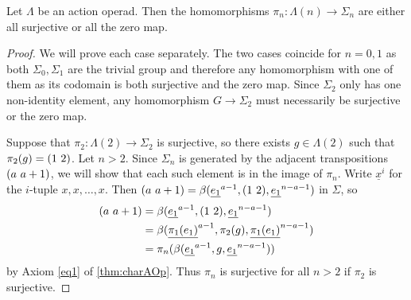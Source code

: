 \begin{prop}\label{prop:surjortriv} Let $\Lambda$ be an action operad. Then the homomorphisms $\pi_n \colon \Lambda(n) \rightarrow \Sigma_n$ are either all surjective or all the zero map.
\end{prop}
\begin{proof}
We will prove each case separately. The two cases coincide for $n = 0, 1$ as both $\Sigma_0, \Sigma_1$ are the trivial group and therefore any homomorphism with one of them as its codomain is both surjective and the zero map. Since $\Sigma_2$ only has one non-identity element, any homomorphism $G \rightarrow \Sigma_2$ must necessarily be surjective or the zero map.

Suppose that $\pi_2 \colon \Lambda(2) \rightarrow \Sigma_2$ is surjective, so there exists $g \in \Lambda(2)$ such that $\pi_2(g) = ( 1 \, \, 2 )$. Let $n>2$. Since $\Sigma_n$ is generated by the adjacent transpositions $( a \, \, a+1 )$, we will show that each such element is in the image of $\pi_n$. Write $\underline{x}^i$ for the $i$-tuple $x, x, \ldots, x$. Then $( a \, \, a+1 ) = \beta(\underline{e_1}^{a-1} ,( 1 \, \, 2 ),\underline{e_1}^{n-a-1})$ in $\Sigma$, so
  \begin{align*}
      ( a \, \, a+1 ) &= \beta(\underline{e_1}^{a-1},( 1 \, \, 2 ),\underline{e_1}^{n-a-1}) \\ &= \beta(\underline{\pi_1(e_1)}^{a-1},\pi_2(g),\underline{\pi_1(e_1)}^{n-a-1}) \\
      &= \pi_n(\beta(\underline{e_1}^{a-1},g,\underline{e_1}^{n-a-1}))
  \end{align*}
by Axiom \ref{eq1} of \ref{thm:charAOp}.
Thus $\pi_n$ is surjective for all $n>2$ if $\pi_2$ is surjective.


\end{proof}
